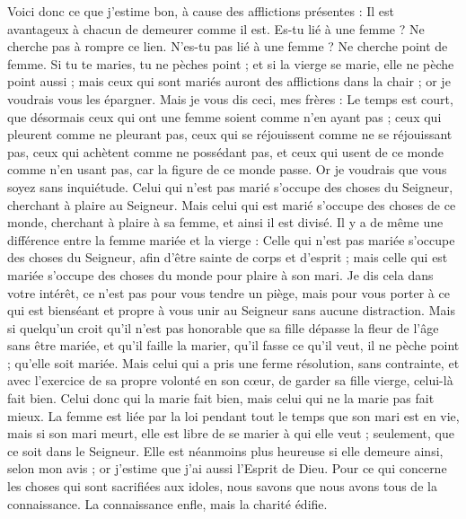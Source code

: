 \begin{multicols}{2}
Voici donc ce que j'estime bon, à cause des afflictions présentes : Il est avantageux à chacun de demeurer comme il est.
Es-tu lié à une femme ? Ne cherche pas à rompre ce lien. N’es-tu pas lié à une femme ? Ne cherche point de femme.
Si tu te maries, tu ne pèches point ; et si la vierge se marie, elle ne pèche point aussi ; mais ceux qui sont mariés auront des afflictions dans la chair ; or je voudrais vous les épargner.
Mais je vous dis ceci, mes frères : Le temps est court, que désormais ceux qui ont une femme soient comme n’en ayant pas ;
ceux qui pleurent comme ne pleurant pas, ceux qui se réjouissent comme ne se réjouissant pas, ceux qui achètent comme ne possédant pas,
et ceux qui usent de ce monde comme n'en usant pas, car la figure de ce monde passe.
Or je voudrais que vous soyez sans inquiétude. Celui qui n'est pas marié s’occupe des choses du Seigneur, cherchant à plaire au Seigneur.
Mais celui qui est marié s’occupe des choses de ce monde, cherchant à plaire à sa femme, et ainsi il est divisé.
Il y a de même une différence entre la femme mariée et la vierge : Celle qui n’est pas mariée s’occupe des choses du Seigneur, afin d’être sainte de corps et d'esprit ; mais celle qui est mariée s’occupe des choses du monde pour plaire à son mari.
Je dis cela dans votre intérêt, ce n’est pas pour vous tendre un piège, mais pour vous porter à ce qui est bienséant et propre à vous unir au Seigneur sans aucune distraction.
Mais si quelqu'un croit qu’il n’est pas honorable que sa fille dépasse la fleur de l’âge sans être mariée, et qu’il faille la marier, qu'il fasse ce qu'il veut, il ne pèche point ; qu'elle soit mariée.
Mais celui qui a pris une ferme résolution, sans contrainte, et avec l’exercice de sa propre volonté en son cœur, de garder sa fille vierge, celui-là fait bien.
Celui donc qui la marie fait bien, mais celui qui ne la marie pas fait mieux.
La femme est liée par la loi pendant tout le temps que son mari est en vie, mais si son mari meurt, elle est libre de se marier à qui elle veut ; seulement, que ce soit dans le Seigneur.
Elle est néanmoins plus heureuse si elle demeure ainsi, selon mon avis ; or j'estime que j'ai aussi l'Esprit de Dieu.
\VerseOne{}Pour ce qui concerne les choses qui sont sacrifiées aux idoles, nous savons que nous avons tous de la connaissance. La connaissance enfle, mais la charité édifie.

\end{multicols}
